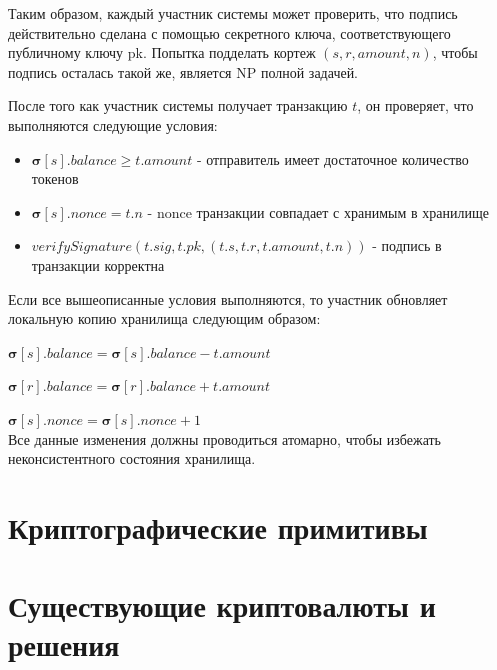 \noindent Таким образом, каждый участник системы может проверить, что подпись действительно сделана с помощью секретного ключа, соответствующего публичному ключу pk. Попытка подделать кортеж $(s, r, amount, n)$, чтобы подпись осталась такой же, является NP полной задачей.

После того как участник системы получает транзакцию $t$, он проверяет, что выполняются следующие условия:
\begin{itemize}
\item $\boldsymbol{\sigma}[s].balance \ge t.amount$ - отправитель имеет достаточное количество токенов
\item $\boldsymbol{\sigma}[s].nonce = t.n$ - nonce транзакции совпадает с хранимым в хранилище
\item $verifySignature(t.sig, t.pk, (t.s, t.r, t.amount, t.n))$ - подпись в транзакции корректна
\end{itemize}

Если все вышеописанные условия выполняются, то участник обновляет локальную копию хранилища следующим образом:

$\boldsymbol{\sigma}[s].balance = \boldsymbol{\sigma}[s].balance - t.amount$

$\boldsymbol{\sigma}[r].balance = \boldsymbol{\sigma}[r].balance + t.amount$

$\boldsymbol{\sigma}[s].nonce = \boldsymbol{\sigma}[s].nonce + 1$\\
Все данные изменения должны проводиться атомарно, чтобы избежать неконсистентного состояния хранилища.


\section{Криптографические примитивы}

\section{Существующие криптовалюты и решения}

